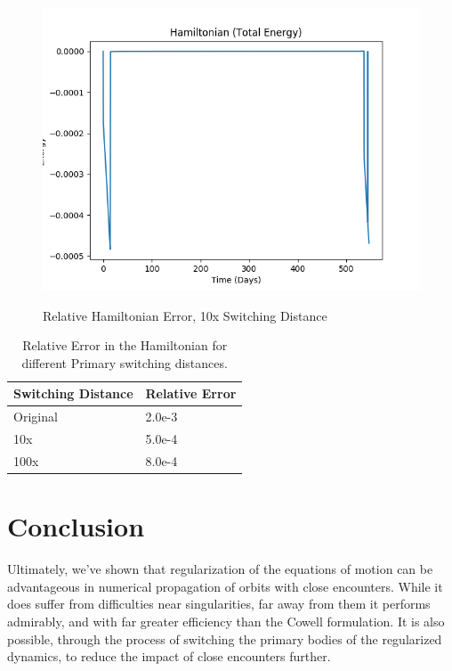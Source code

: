 \documentclass[11pt,twoside,letterpaper]{article}
\begin{document}
  \begin{figure}
    \caption{Relative Hamiltonian Error, 10x Switching Distance}
    \centering
    \includegraphics[scale=0.5]{Hamiltonian}
    \label{ksham10}
  \end{figure}

  \begin{table}[] \label{switchTable}
    \centering
    \begin{tabular}{|l|l|}
      \hline
      Switching Distance & Relative Error \\ \hline
      Original & 2.0e-3 \\ \hline
      10x & 5.0e-4 \\ \hline
      100x & 8.0e-4 \\ \hline
    \end{tabular}
    \caption{Relative Error in the Hamiltonian for different Primary switching distances.}
  \end{table}

  \section{Conclusion}
  Ultimately, we've shown that regularization of the equations of
  motion can be advantageous in numerical propagation of orbits with
  close encounters. While it does suffer from difficulties near
  singularities, far away from them it performs admirably, and with
  far greater efficiency than the Cowell formulation. It is also
  possible, through the process of switching the primary bodies of the
  regularized dynamics, to reduce the impact of close encounters
  further.
\end{document}
